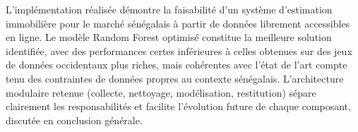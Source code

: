 L'implémentation réalisée démontre la faisabilité d'un système d'estimation immobilière pour le
marché sénégalais à partir de données librement accessibles en ligne. Le modèle Random Forest
optimisé constitue la meilleure solution identifiée, avec des performances certes inférieures à
celles obtenues sur des jeux de données occidentaux plus riches, mais cohérentes avec l'état de
l'art compte tenu des contraintes de données propres au contexte sénégalais. L'architecture
modulaire retenue (collecte, nettoyage, modélisation, restitution) sépare clairement les
responsabilités et facilite l'évolution future de chaque composant, discutée en conclusion
générale.
